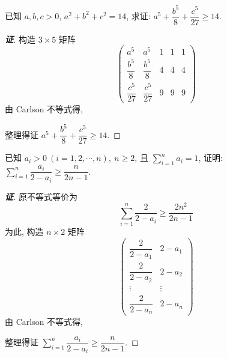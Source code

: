 \begin{example}
    已知 $a,b,c>0$, $a^2+b^2+c^2=14$, 求证: $a^5+\dfrac{b^5}{8}+\dfrac{c^5}{27}\geqslant 14.$
\end{example}
\begin{proof}[{\songti \textbf{证}}]
    构造 $3\times 5$ 矩阵
    $$\begin{pmatrix}
            a^5             & a^5             & 1 & 1 & 1 \\[6pt]
            \dfrac{b^5}{8}  & \dfrac{b^5}{8}  & 4 & 4 & 4 \\[6pt]
            \dfrac{c^5}{27} & \dfrac{c^5}{27} & 9 & 9 & 9
        \end{pmatrix}$$
    由 Carlson 不等式得, 
    整理得证 $a^5+\dfrac{b^5}{8}+\dfrac{c^5}{27}\geqslant 14.$
\end{proof}

\begin{example}
    已知 $a_i>0~ (i=1,2,\cdots,n),~n\geqslant 2$, 且 $\displaystyle\sum_{i=1}^{n}a_i=1$, 
    证明: $\displaystyle\sum_{i=1}^{n}\dfrac{a_i}{2-a_i}\geqslant \dfrac{n}{2n-1}.$
\end{example}
\begin{proof}[{\songti \textbf{证}}]
    原不等式等价为 $$\sum_{i=1}^{n}\dfrac{2}{2-a_i}\geqslant \dfrac{2n^2}{2n-1}$$
    为此, 构造 $n\times 2$ 矩阵
    $$\begin{pmatrix}
            \dfrac{2}{2-a_1} & 2-a_1  \\[6pt]
            \dfrac{2}{2-a_2} & 2-a_2  \\[6pt]
            \vdots           & \vdots \\[6pt]
            \dfrac{2}{2-a_n} & 2-a_n
        \end{pmatrix}$$
    由 Carlson 不等式得, 
    整理得证 $\displaystyle\sum_{i=1}^{n}\dfrac{a_i}{2-a_i}\geqslant \dfrac{n}{2n-1}.$
\end{proof}

